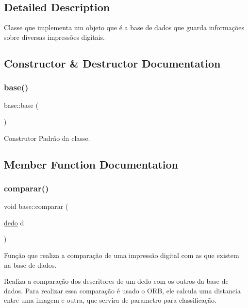 \subsection{Detailed Description}
Classe que implementa um objeto que é a base de dados que guarda informações sobre diversas impressões digitais. 



\subsection{Constructor \& Destructor Documentation}
\mbox{\label{classbase_a3b0362be8b58605e4975b969dd8131a4}} 
\subsubsection{\texorpdfstring{base()}{base()}}
{\footnotesize\ttfamily base\+::base (\begin{DoxyParamCaption}{ }\end{DoxyParamCaption})\hspace{0.3cm}{\ttfamily [inline]}}



Construtor Padrão da classe. 



\subsection{Member Function Documentation}
\mbox{\label{classbase_a32a63a8bc58d7b21224f3a1caf59ed02}} 
\subsubsection{\texorpdfstring{comparar()}{comparar()}}
{\footnotesize\ttfamily void base\+::comparar (\begin{DoxyParamCaption}\item[{\mbox{\hyperlink{classdedo}{dedo}}}]{d }\end{DoxyParamCaption})}



Função que realiza a comparação de uma impressão digital com as que existem na base de dados. 

Realiza a comparação dos descritores de um dedo com os outros da base de dados. Para realizar essa comparação é usado o O\+RB, ele calcula uma distancia entre uma imagem e outra, que servira de parametro para classificação.


